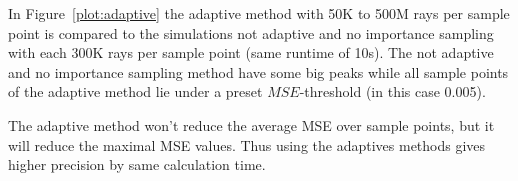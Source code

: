 In Figure~\ref{plot:adaptive} the adaptive method with 
50K to 500M rays per sample point is compared to the simulations
not adaptive and no importance sampling with each 300K rays per sample point (same runtime of 10s).
The not adaptive and no importance sampling method have some big peaks while all sample points of 
the adaptive method lie under a preset $MSE$-threshold (in this case 0.005). 

The adaptive method won't reduce the average MSE over sample points,
but it will reduce the maximal MSE values. Thus using the adaptives
methods gives higher precision by same calculation time.



